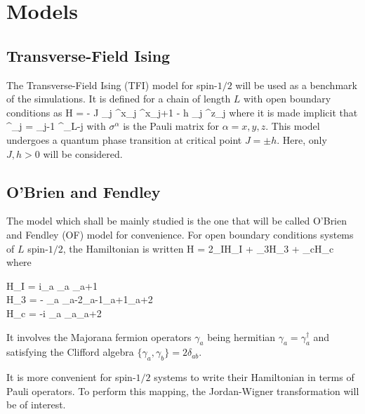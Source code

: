 \section{Models}	

	\subsection{Transverse-Field Ising}	

		The Transverse-Field Ising (TFI) model for spin-$1/2$ will be used as a benchmark of the simulations. It is defined for a chain of length $L$ with open boundary conditions as
		\be \mc H = - J \sum_j \sigma^x_j \sigma^x_{j+1} - h \sum_j \sigma^z_j \label{eq:TFI} \ee
		where it is made implicit that 
		\be \sigma^\alpha_j = \underbrace{\one \otimes \cdots \otimes \one}_{j-1} \otimes \sigma^\alpha \otimes \underbrace{\one \otimes \cdots \otimes \one}_{L-j} \ee
		with $\sigma^\alpha$ is the Pauli matrix for $\alpha=x,y,z$. This model undergoes a quantum phase transition at critical point $J=\pm h$. Here, only $J, h > 0$ will be considered.

	\subsection{O'Brien and Fendley}

		The model which shall be mainly studied is the one that will be called O'Brien and Fendley \cite{obrien2018} (OF) model for convenience. For open boundary conditions systems of $L$ spin-$1/2$, the Hamiltonian is written
		\be \mc H = 2\lambda_I\mc H_I + \lambda_3\mc H_3 + \lambda_c\mc H_c \ee
		where
		\be \begin{cases} \mc H_I = i\sum_a \gamma_a \gamma_{a+1} \\ \mc H_3 = - \sum_a \gamma_{a-2}\gamma_{a-1}\gamma_{a+1}\gamma_{a+2} \\ \mc H_c = -i \sum_a \gamma_a\gamma_{a+2} \end{cases} \ee
		It involves the Majorana fermion operators $\gamma_a$ being hermitian $\gamma_a = \gamma_a^\dagger$ and satisfying the Clifford algebra $\{\gamma_a, \gamma_b\} = 2\delta_{ab}$.

		It is more convenient for spin-$1/2$ systems to write their Hamiltonian in terms of Pauli operators. To perform this mapping, the Jordan-Wigner transformation will be of interest.

